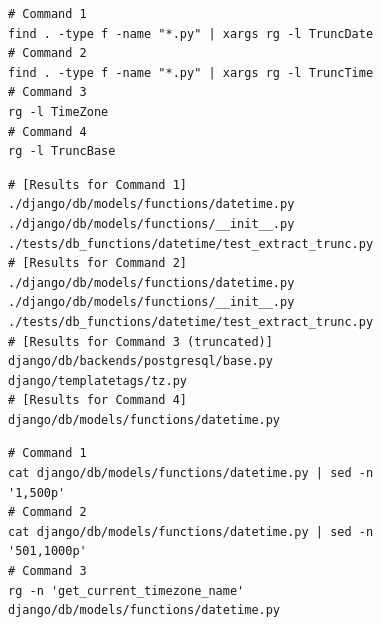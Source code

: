 \begin{figure}[!ht]
    \centering

\begin{tcolorbox}[colback=blue!3!white, colframe=blue!75!black, title={\small Action 1 (Terminal Tool - 4 parallel calls)}]
\begin{lstlisting}[basicstyle=\fontsize{7.5}{8.5}\ttfamily, breaklines=true]
# Command 1
find . -type f -name "*.py" | xargs rg -l TruncDate
# Command 2
find . -type f -name "*.py" | xargs rg -l TruncTime
# Command 3
rg -l TimeZone
# Command 4
rg -l TruncBase
\end{lstlisting}
\end{tcolorbox}

\begin{tcolorbox}[colback=orange!5!white, colframe=orange!75!black, title={\small Observation 1 (trimmed)}]
\begin{lstlisting}[basicstyle=\fontsize{7.5}{8.5}\ttfamily, breaklines=true]
# [Results for Command 1]
./django/db/models/functions/datetime.py
./django/db/models/functions/__init__.py
./tests/db_functions/datetime/test_extract_trunc.py
# [Results for Command 2]
./django/db/models/functions/datetime.py
./django/db/models/functions/__init__.py
./tests/db_functions/datetime/test_extract_trunc.py
# [Results for Command 3 (truncated)]
django/db/backends/postgresql/base.py
django/templatetags/tz.py
# [Results for Command 4]
django/db/models/functions/datetime.py
\end{lstlisting}
\end{tcolorbox}
\begin{tcolorbox}[colback=blue!3!white, colframe=blue!75!black, title={\small Action 2 (Terminal Tool - 3 parallel calls)}]
\begin{lstlisting}[basicstyle=\fontsize{7.5}{8.5}\ttfamily, breaklines=true]
# Command 1
cat django/db/models/functions/datetime.py | sed -n '1,500p'
# Command 2
cat django/db/models/functions/datetime.py | sed -n '501,1000p'
# Command 3
rg -n 'get_current_timezone_name' django/db/models/functions/datetime.py
\end{lstlisting}
\end{tcolorbox}


\end{figure}
